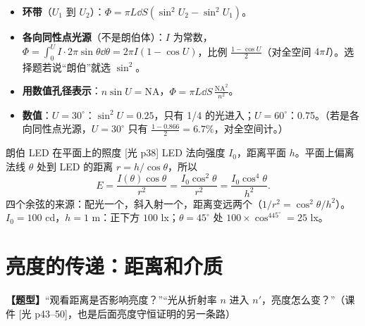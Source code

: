 \begin{warn}[变式]
\begin{itemize}
\item \textbf{环带}（$U_1$ 到 $U_2$）：$\Phi=\pi L\dd S(\sin^2U_2-\sin^2U_1)$。
\item \textbf{各向同性点光源}（不是朗伯体）：$I$ 为常数，$\Phi=\int_0^U I\cdot2\pi\sin\theta\dd\theta=2\pi I(1-\cos U)$，比例 $\frac{1-\cos U}{2}$（对全空间 $4\pi I$）。选择题若说“朗伯”就选 $\sin^2$。
\item \textbf{用数值孔径表示}：$n\sin U=\mathrm{NA}$，$\Phi=\pi L\dd S\,\frac{\mathrm{NA}^2}{n^2}$。
\item \textbf{数值}：$U=30^\circ$：$\sin^2U=0.25$，只有 1/4 的光进入；$U=60^\circ$：0.75。（若是各向同性点光源，$U=30^\circ$ 只有 $\frac{1-0.866}{2}=6.7\%$，对全空间计。）
\end{itemize}
\end{warn}

\begin{exam}{朗伯 LED 在平面上的照度 [光 p38]}
LED 法向强度 $I_0$，距离平面 $h$。平面上偏离法线 $\theta$ 处到 LED 的距离 $r=h/\cos\theta$，所以
\[
E=\frac{I(\theta)\cos\theta}{r^2}=\frac{I_0\cos^2\theta}{r^2}=\frac{I_0\cos^4\theta}{h^2}.
\]
四个余弦的来源：配光一个，斜入射一个，距离变远两个（$1/r^2=\cos^2\theta/h^2$）。$I_0=100$ cd，$h=1$ m：正下方 $100$ lx；$\theta=45^\circ$ 处 $100\times\cos^445^\circ=25$ lx。
\end{exam}

\section{亮度的传递：距离和介质}\label{sec:lumprop}
\textbf{【题型】}“观看距离是否影响亮度？”“光从折射率 $n$ 进入 $n'$，亮度怎么变？”（课件 [光 p43--50]，也是后面亮度守恒证明的另一条路）

\begin{center}
\end{center}

